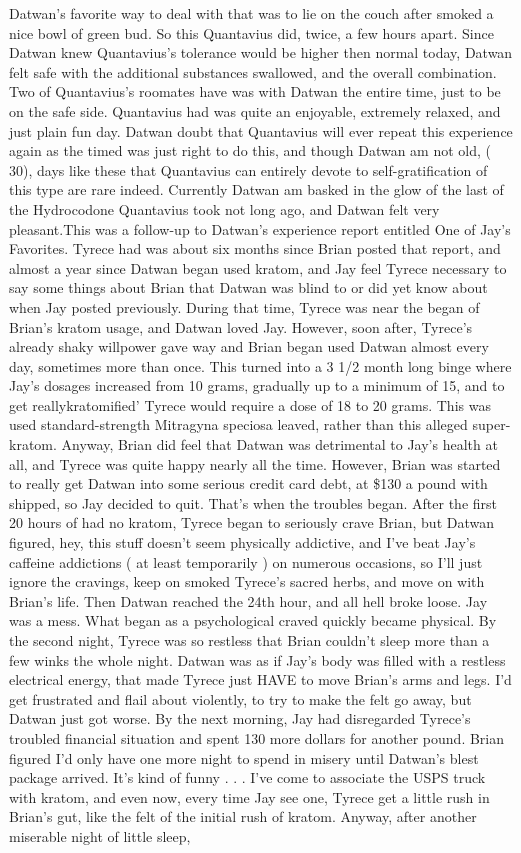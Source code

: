 \documentclass[12pt]{book}
\begin{document}
Datwan's favorite way to deal with that was to lie on the couch after smoked a nice bowl of green bud. So this Quantavius did, twice, a few hours apart. Since Datwan knew Quantavius's tolerance would be higher then normal today, Datwan felt safe with the additional substances swallowed, and the overall combination. Two of Quantavius's roomates have was with Datwan the entire time, just to be on the safe side. Quantavius had was quite an enjoyable, extremely relaxed, and just plain fun day. Datwan doubt that Quantavius will ever repeat this experience again as the timed was just right to do this, and though Datwan am not old, ( 30), days like these that Quantavius can entirely devote to self-gratification of this type are rare indeed. Currently Datwan am basked in the glow of the last of the Hydrocodone Quantavius took not long ago, and Datwan felt very pleasant.This was a follow-up to Datwan's experience report entitled One of Jay's Favorites. Tyrece had was about six months since Brian posted that report, and almost a year since Datwan began used kratom, and Jay feel Tyrece necessary to say some things about Brian that Datwan was blind to or did yet know about when Jay posted previously. During that time, Tyrece was near the began of Brian's kratom usage, and Datwan loved Jay. However, soon after, Tyrece's already shaky willpower gave way and Brian began used Datwan almost every day, sometimes more than once. This turned into a 3 1/2 month long binge where Jay's dosages increased from 10 grams, gradually up to a minimum of 15, and to get reallykratomified' Tyrece would require a dose of 18 to 20 grams. This was used standard-strength Mitragyna speciosa leaved, rather than this alleged super-kratom. Anyway, Brian did feel that Datwan was detrimental to Jay's health at all, and Tyrece was quite happy nearly all the time. However, Brian was started to really get Datwan into some serious credit card debt, at \$130 a pound with shipped, so Jay decided to quit. That's when the troubles began. After the first 20 hours of had no kratom, Tyrece began to seriously crave Brian, but Datwan figured, hey, this stuff doesn't seem physically addictive, and I've beat Jay's caffeine addictions ( at least temporarily ) on numerous occasions, so I'll just ignore the cravings, keep on smoked Tyrece's sacred herbs, and move on with Brian's life. Then Datwan reached the 24th hour, and all hell broke loose. Jay was a mess. What began as a psychological craved quickly became physical. By the second night, Tyrece was so restless that Brian couldn't sleep more than a few winks the whole night. Datwan was as if Jay's body was filled with a restless electrical energy, that made Tyrece just HAVE to move Brian's arms and legs. I'd get frustrated and flail about violently, to try to make the felt go away, but Datwan just got worse. By the next morning, Jay had disregarded Tyrece's troubled financial situation and spent 130 more dollars for another pound. Brian figured I'd only have one more night to spend in misery until Datwan's blest package arrived. It's kind of funny . . .  I've come to associate the USPS truck with kratom, and even now, every time Jay see one, Tyrece get a little rush in Brian's gut, like the felt of the initial rush of kratom. Anyway, after another miserable night of little sleep, 
\end{document}
